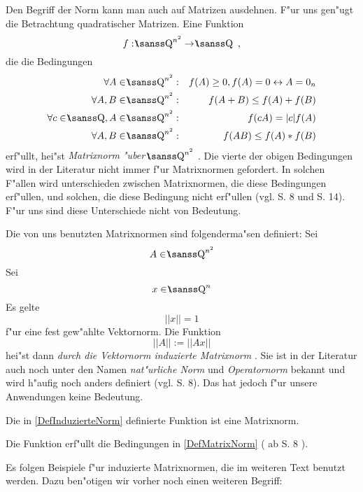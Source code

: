Den Begriff der Norm kann man auch auf Matrizen ausdehnen. F"ur uns 
gen"ugt die Betrachtung quadratischer Matrizen.
\MyBeginDef
{} 
\label{DefMatrixNorm}
    Eine Funktion 
    \[ f: \Rationals^{n^2} \rightarrow \Rationals \MyKomma \]
    die die Bedingungen
    \begin{eqnarray*}
        \forall A \in \Rationals^{n^2} & : & f(A) \geq 0,
             f(A) = 0 \leftrightarrow A=0_n \\
        \forall A,B \in \Rationals^{n^2} & : & f(A+B) \leq f(A) + f(B) \\
        \forall c \in \Rationals, A \in \Rationals^{n^2} & : &
             f(cA) = |c|f(A) \\
        \forall A,B \in \Rationals^{n^2} & : & f(AB) \leq f(A) * f(B) \\
    \end{eqnarray*}
    erf"ullt, hei"st {\em Matrixnorm "uber $\Rationals^{n^2}$ }.
\MyEndDef
Die vierte der obigen Bedingungen wird in der Literatur nicht immer f"ur 
Matrixnormen gefordert. In solchen F"allen wird unterschieden zwischen
Matrixnormen, die diese Bedingungen erf"ullen, und solchen, die diese
Bedingung nicht erf"ullen (vgl. \cite{Isaa73} S. 8 und \cite{GL83}
S. 14). F"ur uns sind diese Unterschiede nicht von Bedeutung.

Die von uns benutzten Matrixnormen sind folgenderma"sen definiert:
\MyBeginDef
\label{DefInduzierteNorm}
 
 
    Sei \[ A \in \Rationals^{n^2} \] Sei \[ x \in \Rationals^n \] Es gelte
    \[ ||x|| = 1 \] f"ur eine fest gew"ahlte Vektornorm.
    Die Funktion \[ ||A||:= ||Ax|| \] hei"st dann
    {\em durch die Vektornorm induzierte Matrixnorm }.
\MyEndDef
Sie ist in der Literatur auch noch unter den Namen {\em nat"urliche Norm}
und {\em Operatornorm} bekannt und wird h"aufig noch anders definiert
(vgl. \cite{Isaa73} S. 8). Das hat jedoch f"ur unsere Anwendungen keine
Bedeutung.

\begin{satz}
\label{SatzInduzierteNorm}
    Die in \ref{DefInduzierteNorm} definierte Funktion ist eine
    Matrixnorm.
\end{satz}
\begin{beweis}
    Die Funktion erf"ullt die Bedingungen in \ref{DefMatrixNorm}
    (\cite{Isaa73} ab S. 8 ).
\end{beweis}

Es folgen Beispiele f"ur induzierte
Matrixnormen, die im weiteren Text benutzt werden. Dazu ben"otigen wir
vorher noch einen weiteren Begriff:

